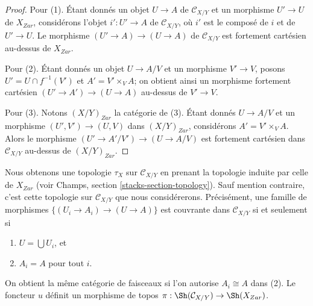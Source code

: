 \begin{proof}
Pour (1). Étant donnés un objet $U \to A$ de $\mathcal{C}_{X/Y}$ et un
morphisme $U' \to U$ de $X_{Zar}$, considérons l'objet $i' : U' \to A$ de
$\mathcal{C}_{X/Y}$, où $i'$ est le composé de $i$ et de $U' \to U$.
Le morphisme $(U' \to A) \to (U \to A)$ de $\mathcal{C}_{X/Y}$
est fortement cartésien au-dessus de $X_{Zar}$.

\medskip\noindent
Pour (2). Étant donnés un objet $U \to A/V$ et un morphisme $V' \to V$,
posons $U' = U \cap f^{-1}(V')$ et $A' = V' \times_V A$; on obtient ainsi
un morphisme fortement cartésien $(U' \to A') \to (U \to A)$ au-dessus de
$V' \to V$.

\medskip\noindent
Pour (3). Notons $(X/Y)_{Zar}$ la catégorie de (3). Étant donnés
$U \to A/V$ et un morphisme $(U', V') \to (U, V)$ dans $(X/Y)_{Zar}$,
considérons $A' = V' \times_V A$. Alors le morphisme
$(U' \to A'/V') \to (U \to A/V)$ est fortement cartésien dans
$\mathcal{C}_{X/Y}$ au-dessus de $(X/Y)_{Zar}$.
\end{proof}

\noindent
Nous obtenons une topologie $\tau_X$ sur $\mathcal{C}_{X/Y}$ en
prenant la topologie induite par celle de $X_{Zar}$ (voir
Champs, section \ref{stacks-section-topology}). Sauf mention contraire,
c'est cette topologie sur $\mathcal{C}_{X/Y}$ que nous considérerons.
Précisément, une famille de morphismes
$\{(U_i \to A_i) \to (U \to A)\}$ est couvrante dans
$\mathcal{C}_{X/Y}$ si et seulement si
\begin{enumerate}
\item $U = \bigcup U_i$, et
\item $A_i = A$ pour tout $i$.
\end{enumerate}
On obtient la même catégorie de faisceaux si l'on autorise
$A_i \cong A$ dans (2). Le foncteur $u$ définit un
morphisme de topos
$\pi : \Sh(\mathcal{C}_{X/Y}) \to \Sh(X_{Zar})$.

